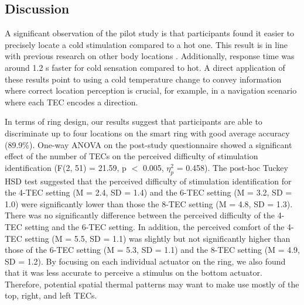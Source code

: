 \documentclass[preprint,12pt]{elsarticle}
\begin{document}
\subsection{Discussion}
A significant observation of the pilot study is that participants found it easier to precisely locate a cold stimulation compared to a hot one. This result is in line with previous research on other body locations \cite{10}. Additionally, response time was around 1.2 s faster for cold sensation compared to hot. A direct application of these results point to using a cold temperature change to convey information where correct location perception is crucial, for example, in a navigation scenario where each TEC encodes a direction.


In terms of ring design, our results suggest that participants are able to discriminate up to four locations on the smart ring with good average accuracy (89.9\%). One-way ANOVA on the post-study questionnaire showed a significant effect of the number of TECs on the perceived difficulty of stimulation identification (F(2, 51) = 21.59, p $<$ 0.005, $\eta_p^2$ = 0.458). The post-hoc Tuckey HSD test suggested that the perceived difficulty of stimulation identification for the 4-TEC setting (M = 2.4, SD = 1.4) and the 6-TEC setting (M = 3.2, SD = 1.0) were significantly lower than those the 8-TEC setting (M = 4.8, SD = 1.3). There was no significantly difference between the perceived difficulty of the 4-TEC setting and the 6-TEC setting. In addition, the perceived comfort of the 4-TEC setting (M = 5.5, SD = 1.1) was slightly but not significantly higher than those of the 6-TEC setting (M = 5.3, SD = 1.1) and the 8-TEC setting (M = 4.9, SD = 1.2). By focusing on each individual actuator on the ring, we also found that it was less accurate to perceive a stimulus on the bottom actuator. Therefore, potential spatial thermal patterns may want to make use mostly of the top, right, and left TECs.
\end{document}
